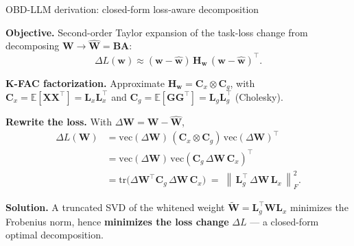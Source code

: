 \documentclass[9pt]{beamer}
\newcommand{\mat}[1]{\mathbf{#1}}
\newcommand{\norm}[1]{\left\lVert#1\right\rVert}
\begin{document}
	\begin{frame}{OBD-LLM derivation: closed-form loss-aware decomposition}

		\textbf{Objective.} Second-order Taylor expansion of the task-loss change from decomposing $\mat{W}\!\to\!\hat{\mat{W}}=\mat{B}\mat{A}$:
		\[
		\Delta L(\mat{w}) \approx (\mat{w}-\hat{\mat{w}})\,\mat{H}_{\mat{w}}\,(\mat{w}-\hat{\mat{w}})^{\!\top}. 
		\]

		\textbf{K-FAC factorization.} Approximate $\mat{H}_{\mat{w}}=\mat{C}_x\otimes\mat{C}_g$, with $\mat{C}_x=\mathbb{E}[\mat{X}\mat{X}^{\!\top}]=\mat{L}_x\mat{L}_x^{\!\top}$ and $\mat{C}_g=\mathbb{E}[\mat{G}\mat{G}^{\!\top}]=\mat{L}_g\mat{L}_g^{\!\top}$ (Cholesky).

		\textbf{Rewrite the loss.} With $\Delta\mat{W}=\mat{W}-\hat{\mat{W}}$,
		\begin{align*}
		\Delta L(\mat{W})
		&=\mathrm{vec}(\Delta\mat{W})\,(\mat{C}_x\otimes\mat{C}_g)\,\mathrm{vec}(\Delta\mat{W})^{\!\top}\\
		&=\mathrm{vec}(\Delta\mat{W})\,\mathrm{vec}(\mat{C}_g\,\Delta\mat{W}\,\mat{C}_x)^{\!\top}\\
		&=\mathrm{tr}\!\big(\Delta\mat{W}^{\!\top}\mat{C}_g\,\Delta\mat{W}\,\mat{C}_x\big)
		\;=\;\norm{\,\mat{L}_g^{\!\top}\,\Delta\mat{W}\,\mat{L}_x\,}_F^2.
		\end{align*}

		\textbf{Solution.} A truncated SVD of the whitened weight $\tilde{\mat{W}}=\mat{L}_g^{\!\top}\mat{W}\mat{L}_x$ minimizes the Frobenius norm, hence \textbf{minimizes the loss change} $\Delta L$ --- a closed-form optimal decomposition.

	\end{frame}

	
	
	
\end{document}
